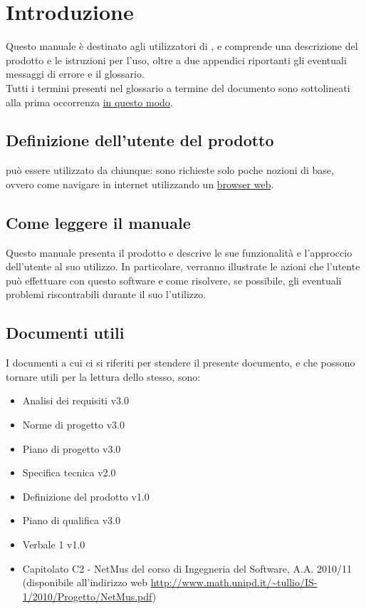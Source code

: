 \tableofcontents

\chapter{Introduzione}
\thispagestyle{fancy} %
Questo manuale \`e destinato agli utilizzatori di , e comprende una
descrizione del prodotto e le istruzioni per l'uso, oltre a due appendici
riportanti gli eventuali messaggi di errore e il glossario.\\

Tutti i termini presenti nel glossario a termine del documento sono sottolineati
alla prima occorrenza \underline{in questo modo}.

\section{Definizione dell'utente del prodotto}
 pu\`o essere utilizzato da chiunque: sono richieste solo poche
nozioni di base, ovvero come navigare in internet utilizzando un
\underline{browser web}.

\section{Come leggere il manuale}
Questo manuale presenta il prodotto  e descrive le sue funzionalit\`a
e l'approccio dell'utente al suo utilizzo. In particolare, verranno illustrate
le azioni che l'utente pu\`o effettuare con questo software e come risolvere, se
possibile, gli eventuali problemi riscontrabili durante il suo l'utilizzo.

\section{Documenti utili}
I documenti a cui ci si  riferiti per stendere il presente documento, e che
possono tornare utili per la lettura dello stesso, sono:
\begin{itemize}
  \item Analisi dei requisiti v3.0
  \item Norme di progetto v3.0
  \item Piano di progetto v3.0
  \item Specifica tecnica v2.0
  \item Definizione del prodotto v1.0
  \item Piano di qualifica v3.0
  \item Verbale 1 v1.0
  \item Capitolato C2 - NetMus del corso di Ingegneria del Software, A.A.
2010/11 (disponibile all'indirizzo web
\url{http://www.math.unipd.it/~tullio/IS-1/2010/Progetto/NetMus.pdf})
\end{itemize}

